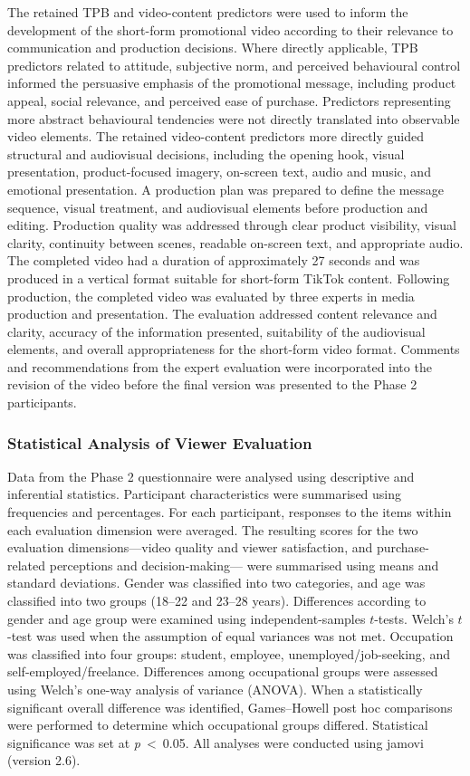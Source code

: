 \documentclass[jtaer,article,submit,moreauthors]{Definitions/mdpi}
\begin{document}
The retained TPB and video-content predictors were used to inform the development of the short-form promotional video according to their relevance to communication and production decisions. Where directly applicable, TPB predictors related to attitude, subjective norm, and perceived behavioural control informed the persuasive emphasis of the promotional message, including product appeal, social relevance, and perceived ease of purchase. Predictors representing more abstract behavioural tendencies were not directly translated into observable video elements.
The retained video-content predictors more directly guided structural and audiovisual decisions, including the opening hook, visual presentation, product-focused imagery, on-screen text, audio and music, and emotional presentation. A production plan was prepared to define the message sequence, visual treatment, and audiovisual elements before production and editing. Production quality was addressed through clear product visibility, visual clarity, continuity between scenes, readable on-screen text, and appropriate audio. The completed video had a duration of approximately 27 seconds and was produced in a vertical format suitable for short-form TikTok content.
Following production, the completed video was evaluated by three experts in media production and presentation. The evaluation addressed content relevance and clarity, accuracy of the information presented, suitability of the audiovisual elements, and overall appropriateness for the short-form video format. Comments and recommendations from the expert evaluation were incorporated into the revision of the video before the final version was presented to the Phase 2 participants.


\subsubsection{Statistical Analysis of Viewer Evaluation}

Data from the Phase 2 questionnaire were analysed using descriptive and
inferential statistics. Participant characteristics were summarised
using frequencies and percentages. For each participant, responses to
the items within each evaluation dimension were averaged. The resulting
scores for the two evaluation dimensions---video quality and viewer
satisfaction, and purchase-related perceptions and decision-making---
were summarised using means and standard deviations.
Gender was classified into two categories, and age was classified into
two groups (18--22 and 23--28 years). Differences according to gender
and age group were examined using independent-samples \(t\)-tests.
Welch's \(t\)-test was used when the assumption of equal variances was
not met.
Occupation was classified into four groups: student, employee,
unemployed/job-seeking, and self-employed/freelance. Differences among
occupational groups were assessed using Welch's one-way analysis of
variance (ANOVA). When a statistically significant overall difference
was identified, Games--Howell post hoc comparisons were performed to
determine which occupational groups differed. Statistical significance
was set at \textit{p}~<~0.05. All analyses were conducted using jamovi
(version 2.6).
\end{document}
